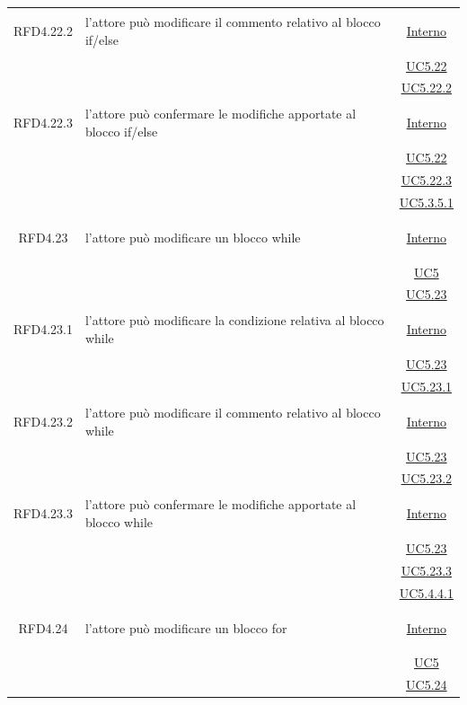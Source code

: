 \begin{longtable}{|c|>{\centering}m{7cm}|c|}
\hypertarget{RFD4.22.2}{RFD4.22.2} & l'attore può modificare il commento relativo al blocco if/else &  \hyperlink{Interno}{Interno}\\
& &\hyperref[UC5.22]{UC5.22}\\
& &\hyperref[UC5.22.2]{UC5.22.2}\\ \hline

\hypertarget{RFD4.22.3}{RFD4.22.3} & l'attore può confermare le modifiche apportate al blocco if/else &  \hyperlink{Interno}{Interno}\\
& &\hyperref[UC5.22]{UC5.22}\\
& &\hyperref[UC5.22.3]{UC5.22.3}\\
& &\hyperref[UC5.3.5.1]{UC5.3.5.1}\\ \hline

\hypertarget{RFD4.23}{RFD4.23} & l'attore può modificare un blocco while &  \hyperlink{Interno}{Interno}\\
& &\hyperref[UC5]{UC5}\\
& &\hyperref[UC5.23]{UC5.23}\\ \hline

\hypertarget{RFD4.23.1}{RFD4.23.1} & l'attore può modificare la condizione relativa al blocco while &  \hyperlink{Interno}{Interno}\\
& &\hyperref[UC5.23]{UC5.23}\\
& &\hyperref[UC5.23.1]{UC5.23.1}\\ \hline

\hypertarget{RFD4.23.2}{RFD4.23.2} & l'attore può modificare il commento relativo al blocco while &  \hyperlink{Interno}{Interno}\\
& &\hyperref[UC5.23]{UC5.23}\\
& &\hyperref[UC5.23.2]{UC5.23.2}\\ \hline

\hypertarget{RFD4.23.3}{RFD4.23.3} & l'attore può confermare le modifiche apportate al blocco while &  \hyperlink{Interno}{Interno}\\
& &\hyperref[UC5.23]{UC5.23}\\
& &\hyperref[UC5.23.3]{UC5.23.3}\\ 
& &\hyperref[UC5.4.4.1]{UC5.4.4.1}\\ \hline

\hypertarget{RFD4.24}{RFD4.24} & l'attore può modificare un blocco for &  \hyperlink{Interno}{Interno}\\
& &\hyperref[UC5]{UC5}\\
& &\hyperref[UC5.24]{UC5.24}\\ \hline


\end{longtable}
